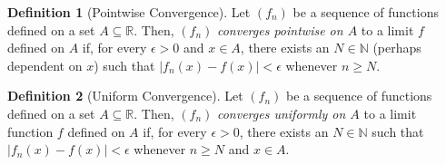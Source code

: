 \documentclass{amsart}
\theoremstyle{definition}
\newtheorem*{definition}{Definition}
\newcommand{\N}{\mathbb{N}}
\newcommand{\R}{\mathbb{R}}
\newcommand{\abs}[1]{|#1|}
\begin{document}
\begin{definition}[Pointwise Convergence]
  Let $(f_n)$ be a sequence of functions defined on a set $A \subseteq \R$.
  Then, $(f_n)$ \emph{converges pointwise on $A$} to a limit $f$ defined on $A$
  if, for every $\epsilon > 0$ and $x \in A$, there exists an $N \in \N$
  (perhaps dependent on $x$) such that $\abs{f_n(x) - f(x)} < \epsilon$ whenever
  $n \ge N$.
\end{definition}

\begin{definition}[Uniform Convergence]
  Let $(f_n)$ be a sequence of functions defined on a set $A \subseteq \R$.
  Then, $(f_n)$ \emph{converges uniformly on $A$} to a limit function $f$
  defined on $A$ if, for every $\epsilon > 0$, there exists an $N \in \N$ such
  that $\abs{f_n(x) - f(x)} < \epsilon$ whenever $n \ge N$ and $x \in A$.
\end{definition}
\end{document}
